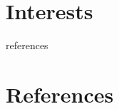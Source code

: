 \documentclass[12pt]{report} %
\begin{document}
\section{Interests}
\interests{}
\fi
\fi



\ifcsname references\endcsname%
\section{References}
\fi


\end{document}
